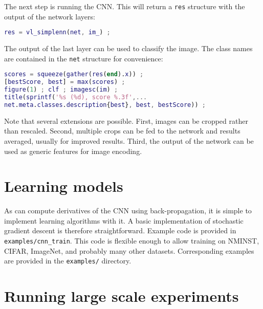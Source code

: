 The next step is running the CNN. This will return a \verb!res! structure with the output of the network layers:
\begin{lstlisting}[language=Matlab]
% run the CNN
res = vl_simplenn(net, im_) ;
\end{lstlisting}

The output of the last layer can be used to classify the image. The class names are contained in the \verb!net! structure for convenience:
\begin{lstlisting}[language=Matlab]
% show the classification result
scores = squeeze(gather(res(end).x)) ;
[bestScore, best] = max(scores) ;
figure(1) ; clf ; imagesc(im) ;
title(sprintf('%s (%d), score %.3f',...
net.meta.classes.description{best}, best, bestScore)) ;
\end{lstlisting}

Note that several extensions are possible. First, images can be cropped rather than rescaled. Second, multiple crops can be fed to the network and results averaged, usually for improved results. Third, the output of the network can be used as generic features for image encoding.

\section{Learning models}

As \matconvnet can compute derivatives of the CNN using back-propagation, it is simple to implement learning algorithms with it. A basic implementation of stochastic gradient descent is therefore straightforward. Example code is provided in \verb!examples/cnn_train!. This code is flexible enough to allow training on NMINST, CIFAR, ImageNet, and probably many other datasets. Corresponding examples are provided in the \verb!examples/! directory.

\section{Running large scale experiments}

